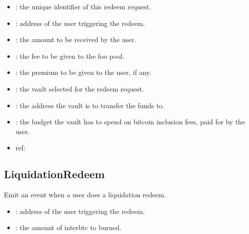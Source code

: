 \documentclass[a4paper,10pt,english]{sphinxmanual}
\begin{document}
\begin{itemize}
\item {} 
: the unique identifier of this redeem request.

\item {} 
: address of the user triggering the redeem.

\item {} 
: the amount to be received by the user.

\item {} 
: the fee to be given to the foo pool.

\item {} 
: the premium to be given to the user, if any.

\item {} 
: the vault selected for the redeem request.

\item {} 
: the address the vault is to transfer the funds to.

\item {} 
: the budget the vault has to spend on bitcoin inclusion fees, paid for by the user.

\end{itemize}

\begin{itemize}
\item {} 
ref:

\end{itemize}


\subsection{LiquidationRedeem}
\label{\detokenize{spec/redeem:id15}}
Emit an event when a user does a liquidation redeem.



\begin{itemize}
\item {} 
: address of the user triggering the redeem.

\item {} 
: the amount of interbtc to burned.

\end{itemize}
\end{document}
